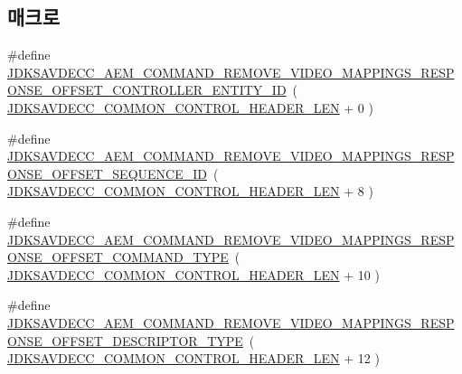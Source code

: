 \subsection*{매크로}
\begin{DoxyCompactItemize}
\item 
\#define \hyperlink{group__command__remove__video__mappings__response_ga26687d4512ac7fdc750452b0213a9469}{J\+D\+K\+S\+A\+V\+D\+E\+C\+C\+\_\+\+A\+E\+M\+\_\+\+C\+O\+M\+M\+A\+N\+D\+\_\+\+R\+E\+M\+O\+V\+E\+\_\+\+V\+I\+D\+E\+O\+\_\+\+M\+A\+P\+P\+I\+N\+G\+S\+\_\+\+R\+E\+S\+P\+O\+N\+S\+E\+\_\+\+O\+F\+F\+S\+E\+T\+\_\+\+C\+O\+N\+T\+R\+O\+L\+L\+E\+R\+\_\+\+E\+N\+T\+I\+T\+Y\+\_\+\+ID}~( \hyperlink{group__jdksavdecc__avtp__common__control__header_gaae84052886fb1bb42f3bc5f85b741dff}{J\+D\+K\+S\+A\+V\+D\+E\+C\+C\+\_\+\+C\+O\+M\+M\+O\+N\+\_\+\+C\+O\+N\+T\+R\+O\+L\+\_\+\+H\+E\+A\+D\+E\+R\+\_\+\+L\+EN} + 0 )
\item 
\#define \hyperlink{group__command__remove__video__mappings__response_gac8bfe08deec2f94ba8b7eedee0dd0fe4}{J\+D\+K\+S\+A\+V\+D\+E\+C\+C\+\_\+\+A\+E\+M\+\_\+\+C\+O\+M\+M\+A\+N\+D\+\_\+\+R\+E\+M\+O\+V\+E\+\_\+\+V\+I\+D\+E\+O\+\_\+\+M\+A\+P\+P\+I\+N\+G\+S\+\_\+\+R\+E\+S\+P\+O\+N\+S\+E\+\_\+\+O\+F\+F\+S\+E\+T\+\_\+\+S\+E\+Q\+U\+E\+N\+C\+E\+\_\+\+ID}~( \hyperlink{group__jdksavdecc__avtp__common__control__header_gaae84052886fb1bb42f3bc5f85b741dff}{J\+D\+K\+S\+A\+V\+D\+E\+C\+C\+\_\+\+C\+O\+M\+M\+O\+N\+\_\+\+C\+O\+N\+T\+R\+O\+L\+\_\+\+H\+E\+A\+D\+E\+R\+\_\+\+L\+EN} + 8 )
\item 
\#define \hyperlink{group__command__remove__video__mappings__response_gab74fcc5c2f0f8a238216d150b7365b47}{J\+D\+K\+S\+A\+V\+D\+E\+C\+C\+\_\+\+A\+E\+M\+\_\+\+C\+O\+M\+M\+A\+N\+D\+\_\+\+R\+E\+M\+O\+V\+E\+\_\+\+V\+I\+D\+E\+O\+\_\+\+M\+A\+P\+P\+I\+N\+G\+S\+\_\+\+R\+E\+S\+P\+O\+N\+S\+E\+\_\+\+O\+F\+F\+S\+E\+T\+\_\+\+C\+O\+M\+M\+A\+N\+D\+\_\+\+T\+Y\+PE}~( \hyperlink{group__jdksavdecc__avtp__common__control__header_gaae84052886fb1bb42f3bc5f85b741dff}{J\+D\+K\+S\+A\+V\+D\+E\+C\+C\+\_\+\+C\+O\+M\+M\+O\+N\+\_\+\+C\+O\+N\+T\+R\+O\+L\+\_\+\+H\+E\+A\+D\+E\+R\+\_\+\+L\+EN} + 10 )
\item 
\#define \hyperlink{group__command__remove__video__mappings__response_gaba6e54367591f5ec123c801f27317370}{J\+D\+K\+S\+A\+V\+D\+E\+C\+C\+\_\+\+A\+E\+M\+\_\+\+C\+O\+M\+M\+A\+N\+D\+\_\+\+R\+E\+M\+O\+V\+E\+\_\+\+V\+I\+D\+E\+O\+\_\+\+M\+A\+P\+P\+I\+N\+G\+S\+\_\+\+R\+E\+S\+P\+O\+N\+S\+E\+\_\+\+O\+F\+F\+S\+E\+T\+\_\+\+D\+E\+S\+C\+R\+I\+P\+T\+O\+R\+\_\+\+T\+Y\+PE}~( \hyperlink{group__jdksavdecc__avtp__common__control__header_gaae84052886fb1bb42f3bc5f85b741dff}{J\+D\+K\+S\+A\+V\+D\+E\+C\+C\+\_\+\+C\+O\+M\+M\+O\+N\+\_\+\+C\+O\+N\+T\+R\+O\+L\+\_\+\+H\+E\+A\+D\+E\+R\+\_\+\+L\+EN} + 12 )

\end{DoxyCompactItemize}
